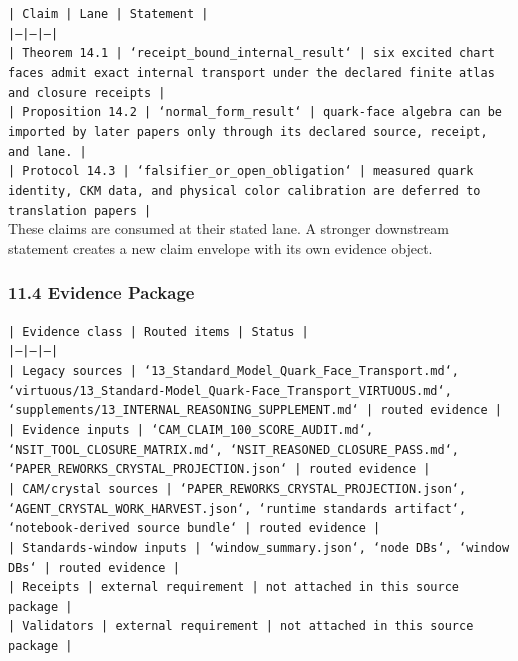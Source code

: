 \documentclass[11pt]{article}
\begin{document}
\noindent\texttt{| Claim | Lane | Statement |}\\
\noindent\texttt{|---|---|---|}\\
\noindent\texttt{| Theorem 14.1 | `receipt\_bound\_internal\_result` | six excited chart faces admit exact internal transport under the declared finite atlas and closure receipts |}\\
\noindent\texttt{| Proposition 14.2 | `normal\_form\_result` | quark-face algebra can be imported by later papers only through its declared source, receipt, and lane. |}\\
\noindent\texttt{| Protocol 14.3 | `falsifier\_or\_open\_obligation` | measured quark identity, CKM data, and physical color calibration are deferred to translation papers |}\\

These claims are consumed at their stated lane. A stronger downstream statement
creates a new claim envelope with its own evidence object.

\subsubsection*{11.4 Evidence Package}

\noindent\texttt{| Evidence class | Routed items | Status |}\\
\noindent\texttt{|---|---|---|}\\
\noindent\texttt{| Legacy sources | `13\_Standard\_Model\_Quark\_Face\_Transport.md`, `virtuous/13\_Standard-Model\_Quark-Face\_Transport\_VIRTUOUS.md`, `supplements/13\_INTERNAL\_REASONING\_SUPPLEMENT.md` | routed evidence |}\\
\noindent\texttt{| Evidence inputs | `CAM\_CLAIM\_100\_SCORE\_AUDIT.md`, `NSIT\_TOOL\_CLOSURE\_MATRIX.md`, `NSIT\_REASONED\_CLOSURE\_PASS.md`, `PAPER\_REWORKS\_CRYSTAL\_PROJECTION.json` | routed evidence |}\\
\noindent\texttt{| CAM/crystal sources | `PAPER\_REWORKS\_CRYSTAL\_PROJECTION.json`, `AGENT\_CRYSTAL\_WORK\_HARVEST.json`, `runtime standards artifact`, `notebook-derived source bundle` | routed evidence |}\\
\noindent\texttt{| Standards-window inputs | `window\_summary.json`, `node DBs`, `window DBs` | routed evidence |}\\
\noindent\texttt{| Receipts | external requirement | not attached in this source package |}\\
\noindent\texttt{| Validators | external requirement | not attached in this source package |}\\
\end{document}
